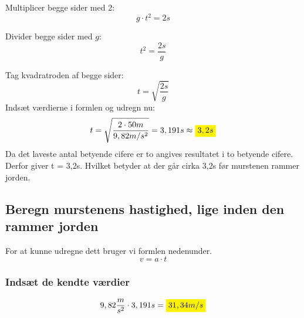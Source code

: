 Multiplicer begge sider med 2:
\[ g \cdot t^2 = 2s \]

Divider begge sider med \( g \):
\[ t^2 = \frac{2s}{g} \]

Tag kvadratroden af begge sider:
\[ t = \sqrt{\frac{2s}{g}} \]
Indsæt værdierne i formlen og udregn nu: 
\begin{equation*}
    t = \sqrt{\frac{2 \cdot 50m}{9,82m/s^2}} = 3,191 s \approx \mathcolorbox{yellow}{3,2s}
\end{equation*}
Da det laveste antal betyende cifere er to angives resultatet i to betyende cifere. Derfor giver t = 3,2s. Hvilket betyder at der går cirka 3,2s før murstenen rammer jorden.

\subsection{Beregn murstenens hastighed, lige inden den rammer jorden}
For at kunne udregne dett bruger vi formlen nedenunder.
\begin{equation*}
    v=a\cdot t
\end{equation*}
\subsubsection{Indsæt de kendte værdier}
\begin{equation*}
    9,82 \frac{m}{s^{2}}\cdot 3,191s = \mathcolorbox{yellow}{31,34 m/s}
\end{equation*}


\newpage